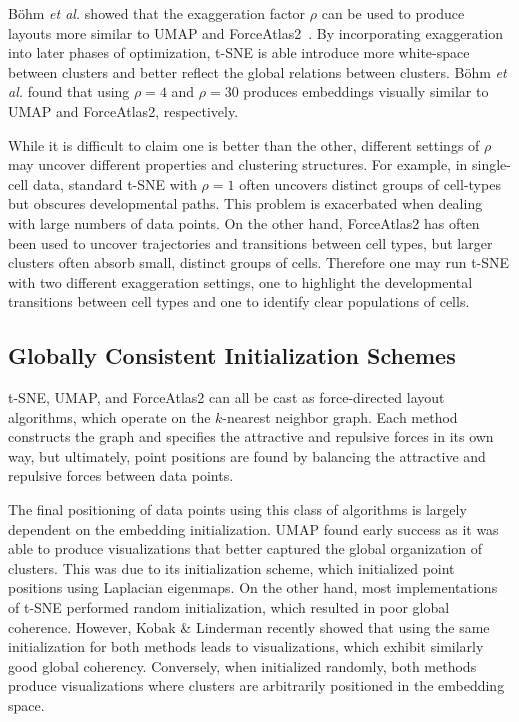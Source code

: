 \documentclass[twocolumn]{bmcart}
\begin{document}
B{\"o}hm \textit{et al.} showed that the exaggeration factor
$\rho$ can be used to produce layouts more similar to UMAP and ForceAtlas2~\cite{bohm2020unifying}.
By incorporating exaggeration into later phases of optimization, t-SNE is able
introduce more white-space between clusters and better reflect the global
relations between clusters. B{\"o}hm \textit{et al.} found that using $\rho=4$ and $\rho=30$
produces embeddings visually similar to UMAP and ForceAtlas2, respectively.

While it is difficult to claim one is better than the other, different settings
of $\rho$ may uncover different properties and clustering structures. For
example, in single-cell data, standard t-SNE with $\rho=1$ often uncovers
distinct groups of cell-types but obscures developmental paths. This problem is
exacerbated when dealing with large numbers of data points. On the other hand,
ForceAtlas2 has often been used to uncover trajectories and transitions between
cell types, but larger clusters often absorb small, distinct groups of cells.
Therefore one may run t-SNE with two different exaggeration settings, one to
highlight the developmental transitions between cell types and one to identify
clear populations of cells.

\subsection*{Globally Consistent Initialization Schemes}

t-SNE, UMAP, and ForceAtlas2 can all be cast as force-directed layout algorithms,
which operate on the $k$-nearest neighbor graph. Each method constructs the graph
and specifies the attractive and repulsive forces in its own way, but ultimately,
point positions are found by balancing the attractive and repulsive forces between data points.

The final positioning of data points using this class of algorithms is largely
dependent on the embedding initialization. UMAP found early success as it was
able to produce visualizations that better captured the global organization of
clusters. This was due to its initialization scheme, which initialized point
positions using Laplacian eigenmaps. On the other hand, most implementations of
t-SNE performed random initialization, which resulted in poor global coherence.
However, Kobak \& Linderman recently showed that using the same initialization
for both methods leads to visualizations, which exhibit similarly good global
coherency. Conversely, when initialized randomly, both methods produce
visualizations where clusters are arbitrarily positioned in the embedding space.
\end{document}
